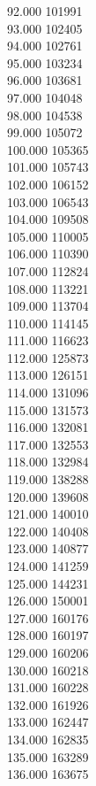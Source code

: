 { 92.000	101991 \\
 93.000	102405 \\
 94.000	102761 \\
 95.000	103234 \\
 96.000	103681 \\
 97.000	104048 \\
 98.000	104538 \\
 99.000	105072 \\
 100.000	105365 \\
 101.000	105743 \\
 102.000	106152 \\
 103.000	106543 \\
 104.000	109508 \\
 105.000	110005 \\
 106.000	110390 \\
 107.000	112824 \\
 108.000	113221 \\
 109.000	113704 \\
 110.000	114145 \\
 111.000	116623 \\
 112.000	125873 \\
 113.000	126151 \\
 114.000	131096 \\
 115.000	131573 \\
 116.000	132081 \\
 117.000	132553 \\
 118.000	132984 \\
 119.000	138288 \\
 120.000	139608 \\
 121.000	140010 \\
 122.000	140408 \\
 123.000	140877 \\
 124.000	141259 \\
 125.000	144231 \\
 126.000	150001 \\
 127.000	160176 \\
 128.000	160197 \\
 129.000	160206 \\
 130.000	160218 \\
 131.000	160228 \\
 132.000	161926 \\
 133.000	162447 \\
 134.000	162835 \\
 135.000	163289 \\
 136.000	163675 \\
}
